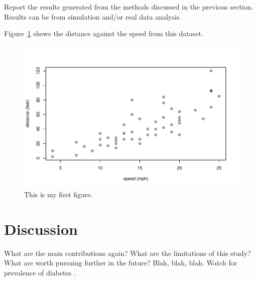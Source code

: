 \documentclass[12pt]{article}
\begin{document}
Report the results generated from the methods discussed in the previous section.  
Results can be from simulation and/or real data analysis.  

Figure~\ref{fig:cars} shows the distance against the speed from this dataset.

\begin{figure}[!t]
  \centering
  \includegraphics[width=\textwidth]{cars.pdf}
  \caption{This is my first figure.}
  \label{fig:cars}
\end{figure}

\section{Discussion}
\label{sec:disc}

What are the main contributions again?
What are the limitations of this study?
What are worth pursuing further in the future?
Blah, blah, blah.  Watch for prevalence of diabetes \citep{wild2004global}.





\end{document}
